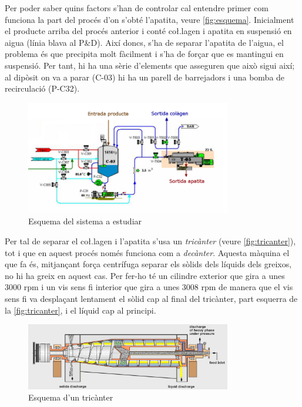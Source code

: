 \documentclass[a4paper]{article}
\begin{document}
Per poder saber quins factors s'han de controlar cal entendre primer com funciona la part del procés d'on s'obté l'apatita, veure \autoref{fig:esquema}. Inicialment el producte arriba del procés anterior i conté co\l.lagen i apatita en suspensió en aigua (línia blava al P\&D). Així doncs, s'ha de separar l'apatita de l'aigua, el problema és que precipita molt fàcilment i s'ha de forçar que es mantingui en suspensió. Per tant, hi ha una sèrie d'elements que asseguren que això sigui així; al dipòsit on va a parar (C-03) hi ha un parell de barrejadors i una bomba de recirculació (P-C32). 

\begin{figure}[H]
	\centering
	\includegraphics[width=0.8\textwidth]{images/esquema}
	\caption{Esquema del sistema a estudiar}
	\label{fig:esquema}
\end{figure}

Per tal de separar el co\l.lagen i l'apatita s'usa un \emph{tricànter} (veure \autoref{fig:tricanter}), tot i que en aquest procés només funciona com a \emph{decànter}. Aquesta màquina el que fa és, mitjançant força centrífuga separar els sòlids dels líquids dels greixos, no hi ha greix en aquest cas. Per fer-ho té un cilindre exterior que gira a unes 3000 rpm i un vis sens fi interior que gira a unes 3008 rpm de manera que el vis sens fi va desplaçant lentament el sòlid cap al final del tricànter, part esquerra de la \autoref{fig:tricanter}, i el líquid cap al principi.

\begin{figure}[H]
	\centering
	\includegraphics[width=0.8\textwidth]{images/tricanter}
	\caption{Esquema d'un tricànter}
	\label{fig:tricanter}
\end{figure}
\end{document}
